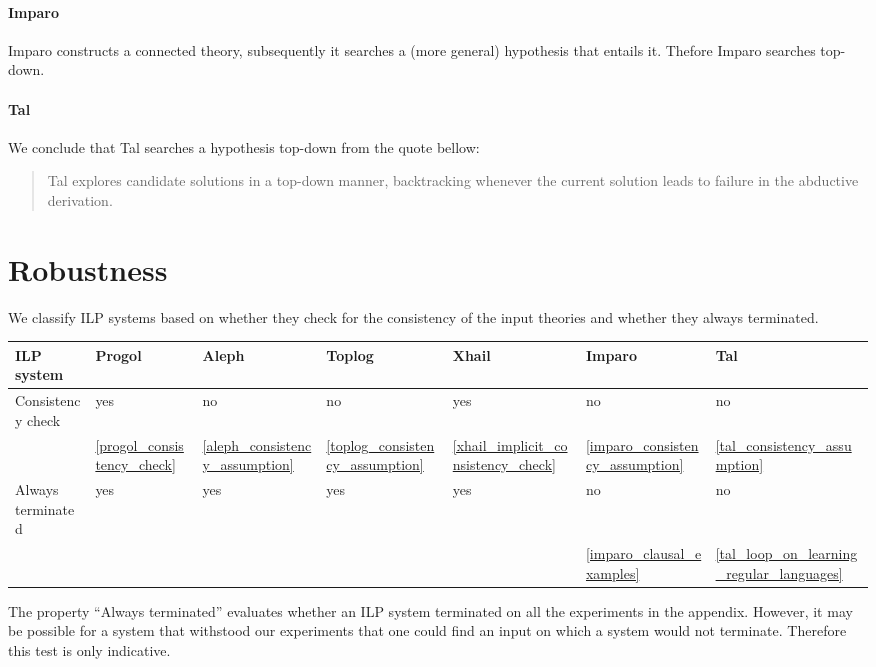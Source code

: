 \paragraph{Imparo\cite{kimber2012learning}}
Imparo constructs a connected theory, subsequently it searches a (more general) hypothesis that entails it. Thefore Imparo searches top-down.

\paragraph{Tal}
We conclude that Tal searches a hypothesis top-down from the quote bellow:
\begin{quote}\cite{corapi2010inductive}
Tal explores candidate solutions in a top-down manner,
backtracking whenever the current solution leads to failure in the abductive derivation.
\end{quote}

\section{Robustness}
We classify ILP systems based on whether they check for the consistency of the input theories and whether they always terminated.

\begin{center}
 \label{tab:title} 
\begin{tabular}{| l | l | l | l | l | l | l |}
    \hline
    ILP system & Progol & Aleph & Toplog & Xhail & Imparo & Tal \\ \hline
    Consistency check & yes & no & no & yes & no & no \\
	& \ref{progol_consistency_check}
	& \ref{aleph_consistency_assumption}
	& \ref{toplog_consistency_assumption}
	 & \ref{xhail_implicit_consistency_check}
	 & \ref{imparo_consistency_assumption}
	 & \ref{tal_consistency_assumption} \\ \hline
    Always terminated & yes & yes & yes & yes & no & no \\ 
	&  & & & & \ref{imparo_clausal_examples} & \ref{tal_loop_on_learning_regular_languages} \\ \hline
\end{tabular}
\end{center} 

The property ``Always terminated'' evaluates whether an ILP system terminated on all the experiments in the appendix. However, it may be possible for a system that withstood our experiments that one could find an input on which a system would not terminate. Therefore this test is only indicative.